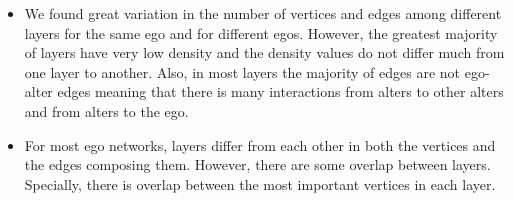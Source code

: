 \begin{itemize} 

    \item We found  great variation in the number of vertices and edges among different layers for the same ego and for different egos. However,  the greatest majority of layers have very low density and the density values do not differ much from one layer to another. Also, in most layers the majority of edges are not ego-alter edges meaning that there is many interactions from alters to other alters and from alters to the ego.

    \item For most ego networks, layers  differ from each other in both the vertices and the edges composing them. However, there are some overlap between layers. Specially, there is overlap between the most important vertices in each layer.



    

\end{itemize}
